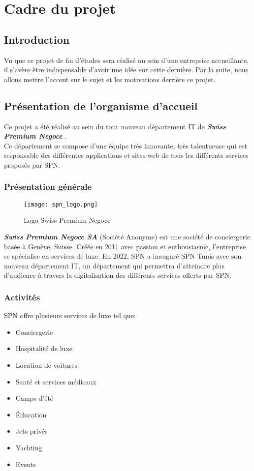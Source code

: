 \chapter{Cadre du projet}
\minitoc
\clearpage
\section{Introduction}
\small{Vu que ce projet de fin d'études sera réalisé au sein d'une entreprise accueillante, il s'avère être indispensable d'avoir une idée sur cette dernière. Par la suite, nous allons mettre l'accent sur le sujet et les motivations derrière ce projet.}
\section{Présentation de l'organisme d'accueil}
Ce projet a été réalisé au sein du tout nouveau département IT de \textit{\textbf{Swiss Premium Negoce}} \cite{spn}.\\
\noindent Ce département se compose d'une équipe très innovante, très talentueuse qui est responsable des différentes applications et sites web de tous les différents services proposés par SPN.
\subsection{Présentation générale}
\vspace{1cm}
\begin{figure}[H]
    \centering
    \texttt{[image: spn\_logo.png]}
    \vspace{0.5cm}
    \caption{Logo Swiss Premium Negoce}
    \label{fig:spn_logo}
\end{figure}
\vspace{1cm}
\textit{\textbf{Swiss Premium Negoce SA}} (Société Anonyme) est une société de conciergerie basée à
Genève, Suisse. Créée en 2011 avec passion et enthousiasme, l'entreprise se spécialise en services de luxe.
En 2022, SPN a inauguré SPN Tunis avec son nouveau département IT, un département qui permettra d'atteindre plus d'audience à travers la digitalisation des différents services offerts par SPN.
\subsection{Activités}
SPN offre plusieurs services de luxe tel que:
\begin{itemize}
    \item Conciergerie
    \item Hospitalité de luxe
    \item Location de voitures
    \item Santé et services médicaux
    \item Camps d'été
    \item Éducation
    \item Jets privés
    \item Yachting
    \item Events
\end{itemize}
